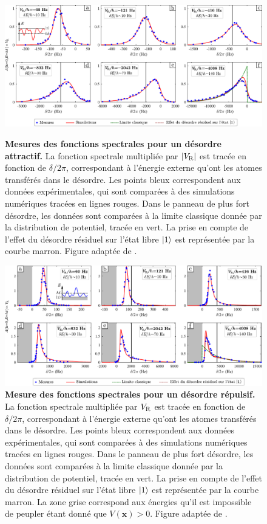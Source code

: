 \begin{figure}
\centering
\includegraphics[width=\textwidth]{Fig/TauS_NJP/fonctions_spectrales_rouge.pdf}
\caption{\textbf{Mesures des fonctions spectrales pour un désordre attractif.} La fonction spectrale multipliée par $|V_{\mathrm{R}}|$ est tracée en fonction de $\delta/2\pi$, correspondant à l'énergie externe qu'ont les atomes transférés dans le désordre. Les points bleux correspondent aux données expérimentales, qui sont comparées à des simulations numériques tracées en lignes rouges. Dans le panneau de plus fort désordre, les données sont comparées à la limite classique donnée par la distribution de potentiel, tracée en vert. La prise en compte de l'effet du désordre résiduel sur l'état libre $\left| 1 \right\rangle$ est représentée par la courbe marron. Figure adaptée de \citep{denechaud2018vers}.}
\label{fig:mesures_fonctions_spectrales_rouge}

\vspace{1cm}
\includegraphics[width=\textwidth]{Fig/TauS_NJP/fonctions_spectrales_bleu.pdf}
\caption{\textbf{Mesure des fonctions spectrales pour un désordre répulsif.} La fonction spectrale multipliée par $V_{\mathrm{R}}$ est tracée en fonction de $\delta/2\pi$, correspondant à l'énergie externe qu'ont les atomes transférés dans le désordre. Les points bleux correspondent aux données expérimentales, qui sont comparées à des simulations numériques tracées en lignes rouges. Dans le panneau de plus fort désordre, les données sont comparées à la limite classique donnée par la distribution de potentiel, tracée en vert. La prise en compte de l'effet du désordre résiduel sur l'état libre $\left| 1 \right\rangle$ est représentée par la courbe marron. La zone grise correspond aux énergies qu'il est impossible de peupler étant donné que $V(\mathbf{x})>0$. Figure adaptée de \citep{denechaud2018vers}.}
\label{fig:mesures_fonctions_spectrales_bleu}
\end{figure}

